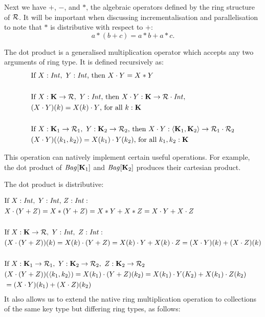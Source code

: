 {{{Next we have $+$, $-$, and $\ast$, the algebraic operators defined by the ring structure of $\mathcal{R}$. It will be important when discussing incrementalisation and parallelisation to note that  $\ast$ is distributive with respect to $+$:
\[
a*(b + c) = a*b + a*c.
\]

The dot product is a generalised multiplication operator which accepts any two arguments of ring type. It is defined recursively as:
\begin{equation*}
\begin{split}
& \textrm{If } X: \textrm{\textit{Int}}, \ Y: \textrm{\textit{Int}}\textrm{, then } X \cdot Y = X * Y \\ \\
& \textrm{If } X: \mathbf{K} \rightarrow \mathcal{R}, \ Y: \textrm{\textit{Int}}\textrm{, then } X \cdot Y : \mathbf{K} \rightarrow \mathcal{R} \cdot \textrm{\textit{Int}}, \\
& (X \cdot Y)(k) = X(k) \cdot Y\textrm{, for all }k: \mathbf{K} \\ \\
& \textrm{If } X: \mathbf{K}_1 \rightarrow \mathcal{R}_1, \ Y: \mathbf{K}_2 \rightarrow \mathcal{R}_2\textrm{, then } X \cdot Y : \langle \mathbf{K}_1, \mathbf{K}_2 \rangle \rightarrow \mathcal{R}_1 \cdot \mathcal{R}_2 \\
& (X \cdot Y)(\langle k_1, k_2 \rangle) = X(k_1) \cdot Y(k_2)\textrm{, for all }k_1,k_2: \mathbf{K}
\end{split}
\end{equation*}

This operation can natively implement certain useful operations. For example, the dot product of $\textrm{\textit{Bag}}[\mathbf{K}_1]$ and $\textrm{\textit{Bag}}[\mathbf{K}_2]$ produces their cartesian product.

The dot product is distributive:

\begin{equation*}
\begin{split}
& \textrm{If } X: \textrm{\textit{Int}}, \ Y: \textrm{\textit{Int}}\textrm, \ Z: \textrm{\textit{Int}}: \\
&X \cdot (Y + Z) = X * (Y + Z) = X*Y + X*Z = X \cdot Y + X \cdot Z \\ \\
& \textrm{If } X: \mathbf{K} \rightarrow \mathcal{R}, \ Y: \textrm{\textit{Int}}, \ Z: \textrm{\textit{Int}}: \\
& (X \cdot (Y+Z))(k) = X(k) \cdot (Y+Z) = X(k) \cdot Y + X(k) \cdot Z = (X \cdot Y)(k) + (X \cdot Z)(k) \\ \\
& \textrm{If } X: \mathbf{K}_1 \rightarrow \mathcal{R}_1, \ Y: \mathbf{K}_2 \rightarrow \mathcal{R}_2, \ Z: \mathbf{K}_2 \rightarrow \mathcal{R}_2 \\
& (X \cdot (Y+Z))(\langle k_1, k_2 \rangle) = X(k_1) \cdot (Y+Z)(k_2) = X(k_1) \cdot Y(K_2) + X(k_1) \cdot Z(k_2) \\
&= (X \cdot Y)(k_1) + (X \cdot Z)(k_2) 
\end{split}
\end{equation*}
\vs
It also allows us to extend the native ring multiplication operation to collections of the same key type but differing ring types, as follows:

}}}
